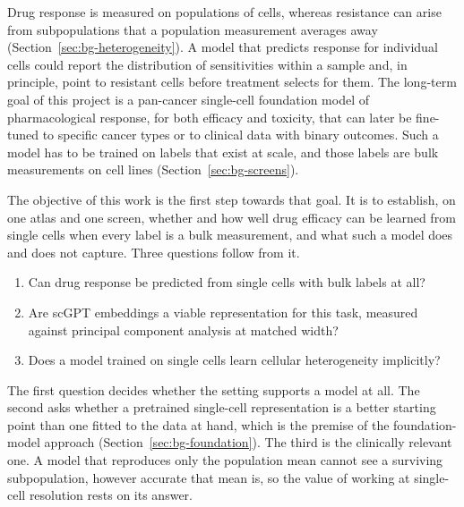 Drug response is measured on populations of cells, whereas resistance can arise from subpopulations
that a population measurement averages away (Section~\ref{sec:bg-heterogeneity}). A model that predicts
response for individual cells could report the distribution of sensitivities within a sample and, in
principle, point to resistant cells before treatment selects for them. The long-term goal of this
project is a pan-cancer single-cell foundation model of pharmacological response, for both efficacy and
toxicity, that can later be fine-tuned to specific cancer types or to clinical data with binary
outcomes. Such a model has to be trained on labels that exist at scale, and those labels are bulk
measurements on cell lines (Section~\ref{sec:bg-screens}).

The objective of this work is the first step towards that goal. It is to establish, on one atlas and one
screen, whether and how well drug efficacy can be learned from single cells when every label is a bulk
measurement, and what such a model does and does not capture. Three questions follow from it.
\begin{enumerate}
  \item Can drug response be predicted from single cells with bulk labels at all?
  \item Are scGPT embeddings a viable representation for this task, measured against principal component
        analysis at matched width?
  \item Does a model trained on single cells learn cellular heterogeneity implicitly?
\end{enumerate}
The first question decides whether the setting supports a model at all. The second asks whether a
pretrained single-cell representation is a better starting point than one fitted to the data at hand,
which is the premise of the foundation-model approach (Section~\ref{sec:bg-foundation}). The third is
the clinically relevant one. A model that reproduces only the population mean cannot see a surviving
subpopulation, however accurate that mean is, so the value of working at single-cell resolution rests
on its answer.
